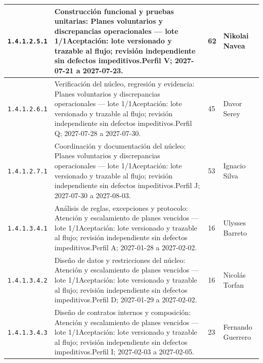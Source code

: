 \begin{longtable}{L{29mm}L{80mm}R{12mm}L{28mm}}
\texttt{1.\allowbreak{}4.\allowbreak{}1.\allowbreak{}2.\allowbreak{}5.\allowbreak{}1} & Construcción funcional y pruebas unitarias: Planes voluntarios y discrepancias operacionales — lote 1/1\newline Aceptación: lote versionado y trazable al flujo; revisión independiente sin defectos impeditivos.\newline Perfil V; 2027-07-21 a 2027-07-23. & 62 & Nikolai Navea\\\hline
\texttt{1.\allowbreak{}4.\allowbreak{}1.\allowbreak{}2.\allowbreak{}6.\allowbreak{}1} & Verificación del núcleo, regresión y evidencia: Planes voluntarios y discrepancias operacionales — lote 1/1\newline Aceptación: lote versionado y trazable al flujo; revisión independiente sin defectos impeditivos.\newline Perfil Q; 2027-07-28 a 2027-07-30. & 45 & Davor Serey\\\hline
\texttt{1.\allowbreak{}4.\allowbreak{}1.\allowbreak{}2.\allowbreak{}7.\allowbreak{}1} & Coordinación y documentación del núcleo: Planes voluntarios y discrepancias operacionales — lote 1/1\newline Aceptación: lote versionado y trazable al flujo; revisión independiente sin defectos impeditivos.\newline Perfil J; 2027-07-30 a 2027-08-03. & 53 & Ignacio Silva\\\hline
\texttt{1.\allowbreak{}4.\allowbreak{}1.\allowbreak{}3.\allowbreak{}4.\allowbreak{}1} & Análisis de reglas, excepciones y protocolo: Atención y escalamiento de planes vencidos — lote 1/1\newline Aceptación: lote versionado y trazable al flujo; revisión independiente sin defectos impeditivos.\newline Perfil A; 2027-01-28 a 2027-02-02. & 16 & Ulysses Barreto\\\hline
\texttt{1.\allowbreak{}4.\allowbreak{}1.\allowbreak{}3.\allowbreak{}4.\allowbreak{}2} & Diseño de datos y restricciones del núcleo: Atención y escalamiento de planes vencidos — lote 1/1\newline Aceptación: lote versionado y trazable al flujo; revisión independiente sin defectos impeditivos.\newline Perfil D; 2027-01-29 a 2027-02-02. & 16 & Nicolás Torfan\\\hline
\texttt{1.\allowbreak{}4.\allowbreak{}1.\allowbreak{}3.\allowbreak{}4.\allowbreak{}3} & Diseño de contratos internos y composición: Atención y escalamiento de planes vencidos — lote 1/1\newline Aceptación: lote versionado y trazable al flujo; revisión independiente sin defectos impeditivos.\newline Perfil I; 2027-02-03 a 2027-02-05. & 23 & Fernando Guerrero\\\hline

\end{longtable}
